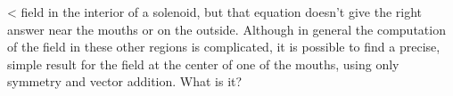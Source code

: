 <%
field in the interior of a solenoid, but that equation
doesn't give the right answer near the mouths or on the
outside. Although in general the computation of the field in
these other regions is complicated, it is possible to find a
precise, simple result for the field at the center of one of
the mouths, using only symmetry and vector addition. What is it?
